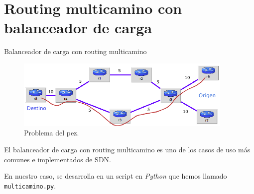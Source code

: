 \documentclass[10pt,spanish,xcolor={svgnames}]{beamer}
\begin{document}
\section{Routing multicamino con balanceador de carga}

\begin{frame}{Balanceador de carga con routing multicamino}
\begin{figure}[h!]
	\centering
	\includegraphics[width=0.93\textwidth]{Imagenes/pez.png}
	\caption{Problema del pez.}
\end{figure}

\vspace*{-2em}
El balanceador de carga con routing multicamino es uno de los casos de uso más comunes e implementados de SDN. 
\vspace{0.6em}

En nuestro caso, se desarrolla en un script en \textit{Python} que hemos llamado \texttt{multicamino.py}. %
\vspace*{-2em}
\end{frame}
\end{document}
